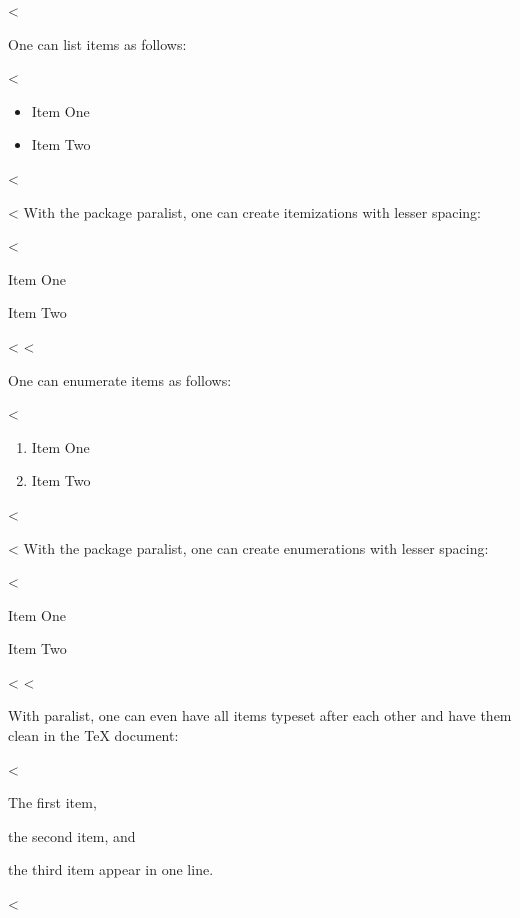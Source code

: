 <%

One can list items as follows:

<%
\begin{itemize}
  \item Item One
  \item Item Two
\end{itemize}
<%

<%
With the package paralist, one can create itemizations with lesser spacing:

<%
\begin{compactitem}
  \item Item One
  \item Item Two
\end{compactitem}
<%
<%

One can enumerate items as follows:

<%
\begin{enumerate}
  \item Item One
  \item Item Two
\end{enumerate}
<%

<%
With the package paralist, one can create enumerations with lesser spacing:

<%
\begin{compactenum}
  \item Item One
  \item Item Two
\end{compactenum}
<%
<%

With paralist, one can even have all items typeset after each other and have them clean in the TeX document:

<%
\begin{inparaenum}
  \item The first item,
  \item the second item, and
  \item the third item appear in one line.
\end{inparaenum}
<%
